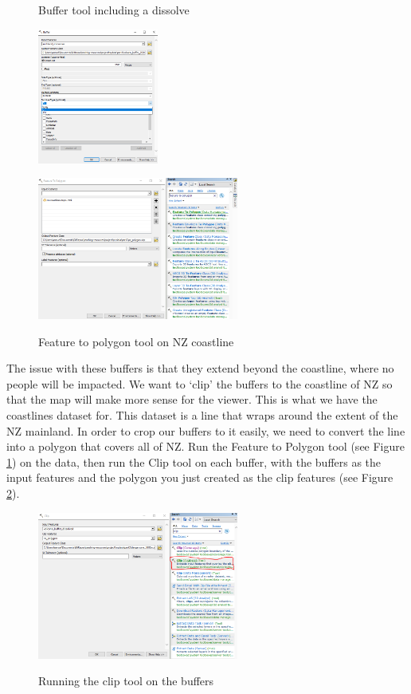 \documentclass{article}
\begin{document}
\begin{figure}[h]
  \centering
  \begin{minipage}[b]{0.3\textwidth}
    \centering
    \caption{Buffer tool including a dissolve}
    \includegraphics[width=150px]{images/part2/volcano_buffer_2.PNG}
    \label{2_volcanobuffer_2}
  \end{minipage}
  \hfill
  \begin{minipage}[b]{0.5\textwidth}
    \centering
    \caption{Feature to polygon tool on NZ coastline}
    \includegraphics[width=250px]{images/part2/featuretopolygon.PNG}
    \label{2_featuretopolygon}
  \end{minipage}
\end{figure}

The issue with these buffers is that they extend beyond the coastline, where no people will be impacted. We want to `clip' the buffers to the coastline of NZ so that the map will make more sense for the viewer. This is what we have the coastlines dataset for. This dataset is a line that wraps around the extent of the NZ mainland. In order to crop our buffers to it easily, we need to convert the line into a polygon that covers all of NZ. Run the Feature to Polygon tool (see Figure \ref{2_featuretopolygon}) on the data, then run the Clip tool on each buffer, with the buffers as the input features and the polygon you just created as the clip features (see Figure \ref{2_clip}).

\begin{figure}[h]
  \centering
  \caption{Running the clip tool on the buffers}
  \includegraphics[width=250px]{images/part2/clip.PNG}
  \label{2_clip}
\end{figure}
\end{document}
